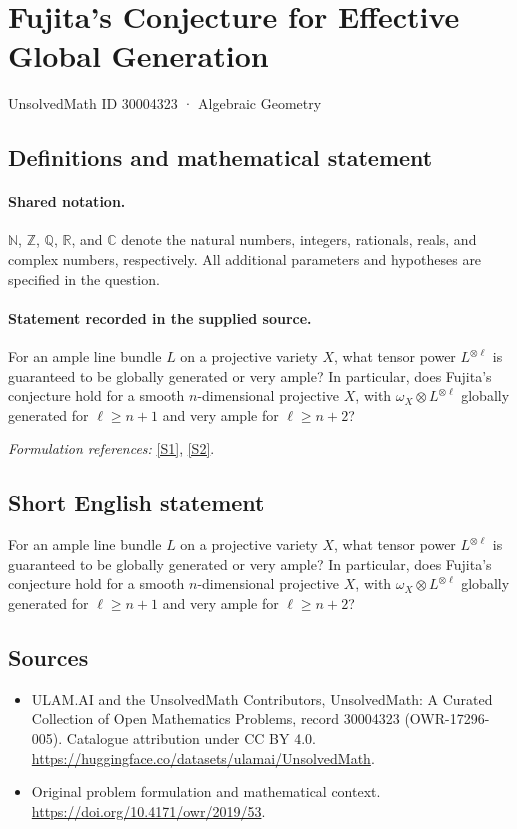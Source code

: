 \documentclass[11pt]{article}
\newcommand{\sref}[2]{\hyperlink{source:#1:#2}{[S#2]}}
\begin{document}
\setcounter{section}{30004322}
\section{Fujita's Conjecture for Effective Global Generation}\label{30004323}
{\small UnsolvedMath ID 30004323 · Algebraic Geometry}
\subsection{Definitions and mathematical statement}

\paragraph{Shared notation.}$\mathbb N$, $\mathbb Z$, $\mathbb Q$, $\mathbb R$, and $\mathbb C$ denote the natural numbers, integers, rationals, reals, and complex numbers, respectively. All additional parameters and hypotheses are specified in the question.


\paragraph{Statement recorded in the supplied source.}
For an ample line bundle $L$ on a projective variety $X$, what tensor power $L^{\otimes\ell}$ is guaranteed to be globally generated or very ample? In particular, does Fujita's conjecture hold for a smooth $n$-dimensional projective $X$, with $\omega_X\otimes L^{\otimes\ell}$ globally generated for $\ell\geq n+1$ and very ample for $\ell\geq n+2$?
\par\smallskip\textit{Formulation references:} \sref{30004323}{1}, \sref{30004323}{2}.
\subsection{Short English statement}
For an ample line bundle $L$ on a projective variety $X$, what tensor power $L^{\otimes\ell}$ is guaranteed to be globally generated or very ample? In particular, does Fujita's conjecture hold for a smooth $n$-dimensional projective $X$, with $\omega_X\otimes L^{\otimes\ell}$ globally generated for $\ell\geq n+1$ and very ample for $\ell\geq n+2$?
\subsection{Sources}
\begin{itemize}
\item[\hypertarget{source:30004323:1}{S1}] ULAM.AI and the UnsolvedMath Contributors, UnsolvedMath: A Curated Collection of Open Mathematics Problems, record 30004323 (OWR-17296-005). Catalogue attribution under CC BY 4.0.
\url{https://huggingface.co/datasets/ulamai/UnsolvedMath}.
\item[\hypertarget{source:30004323:2}{S2}] Original problem formulation and mathematical context.
\url{https://doi.org/10.4171/owr/2019/53}.
\end{itemize}
\label{end:30004323}
\end{document}
